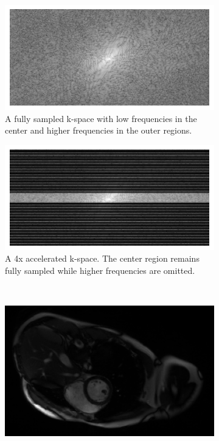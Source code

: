 \begin{figure}[h]%
	\centering
	\graphicspath{{images/}{\main/images/}}
	\begin{subfigure}{0.45\textwidth}
    		\includegraphics[width=\textwidth]{k-space_fullysampled.png}
    		\caption{A fully sampled k-space with low frequencies in the center and higher frequencies in the outer regions.}
    		\label{fig:fullySampled}
	\end{subfigure}
	\hfill
	\begin{subfigure}{0.45\textwidth}
    		\includegraphics[width=\textwidth]{k-space_subsampled.png}
    		\caption{A 4x accelerated k-space. The center region remains fully sampled while higher frequencies are omitted.}
    		\label{fig:subSampled}
	\end{subfigure}\\
	\begin{subfigure}{0.45\textwidth}
    		\includegraphics[width=\textwidth]{image_fullysampled.png}

\end{subfigure}
\end{figure}
